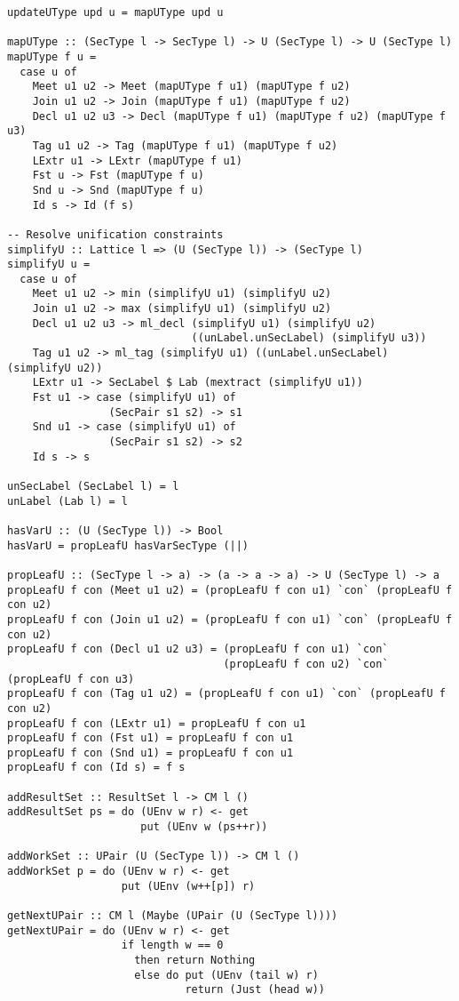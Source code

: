 \begin{Verbatim}[fontsize=\footnotesize,frame=lines,
                 framesep=5mm, label={[Unification.hs]Unification.hs}]
updateUType upd u = mapUType upd u

mapUType :: (SecType l -> SecType l) -> U (SecType l) -> U (SecType l)
mapUType f u =
  case u of
    Meet u1 u2 -> Meet (mapUType f u1) (mapUType f u2)
    Join u1 u2 -> Join (mapUType f u1) (mapUType f u2)
    Decl u1 u2 u3 -> Decl (mapUType f u1) (mapUType f u2) (mapUType f u3)
    Tag u1 u2 -> Tag (mapUType f u1) (mapUType f u2)
    LExtr u1 -> LExtr (mapUType f u1) 
    Fst u -> Fst (mapUType f u)
    Snd u -> Snd (mapUType f u)
    Id s -> Id (f s)

-- Resolve unification constraints
simplifyU :: Lattice l => (U (SecType l)) -> (SecType l)
simplifyU u = 
  case u of
    Meet u1 u2 -> min (simplifyU u1) (simplifyU u2)
    Join u1 u2 -> max (simplifyU u1) (simplifyU u2)
    Decl u1 u2 u3 -> ml_decl (simplifyU u1) (simplifyU u2) 
                             ((unLabel.unSecLabel) (simplifyU u3))
    Tag u1 u2 -> ml_tag (simplifyU u1) ((unLabel.unSecLabel) (simplifyU u2))
    LExtr u1 -> SecLabel $ Lab (mextract (simplifyU u1))
    Fst u1 -> case (simplifyU u1) of
                (SecPair s1 s2) -> s1
    Snd u1 -> case (simplifyU u1) of
                (SecPair s1 s2) -> s2
    Id s -> s

unSecLabel (SecLabel l) = l
unLabel (Lab l) = l

hasVarU :: (U (SecType l)) -> Bool
hasVarU = propLeafU hasVarSecType (||) 

propLeafU :: (SecType l -> a) -> (a -> a -> a) -> U (SecType l) -> a
propLeafU f con (Meet u1 u2) = (propLeafU f con u1) `con` (propLeafU f con u2)
propLeafU f con (Join u1 u2) = (propLeafU f con u1) `con` (propLeafU f con u2)
propLeafU f con (Decl u1 u2 u3) = (propLeafU f con u1) `con` 
                                  (propLeafU f con u2) `con` (propLeafU f con u3)
propLeafU f con (Tag u1 u2) = (propLeafU f con u1) `con` (propLeafU f con u2)
propLeafU f con (LExtr u1) = propLeafU f con u1
propLeafU f con (Fst u1) = propLeafU f con u1
propLeafU f con (Snd u1) = propLeafU f con u1
propLeafU f con (Id s) = f s

addResultSet :: ResultSet l -> CM l ()
addResultSet ps = do (UEnv w r) <- get
                     put (UEnv w (ps++r))

addWorkSet :: UPair (U (SecType l)) -> CM l ()
addWorkSet p = do (UEnv w r) <- get
                  put (UEnv (w++[p]) r)

getNextUPair :: CM l (Maybe (UPair (U (SecType l))))
getNextUPair = do (UEnv w r) <- get
                  if length w == 0
                    then return Nothing
                    else do put (UEnv (tail w) r)
                            return (Just (head w))


\end{Verbatim}
